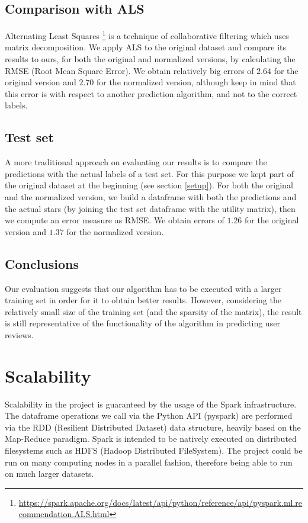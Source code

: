 \documentclass[11pt,a4paper]{article}
\begin{document}
\begin{multicols}{2}
\subsection{Comparison with ALS}
Alternating Least Squares \footnote{\url{https://spark.apache.org/docs/latest/api/python/reference/api/pyspark.ml.recommendation.ALS.html}} is a technique of collaborative filtering which uses matrix decomposition.
We apply ALS to the original dataset and compare its results to ours, for both the original and normalized versions, by calculating the RMSE (Root Mean Square Error).
We obtain relatively big errors of $2.64$ for the original version and $2.70$ for the normalized version, although keep in mind that this error is with respect to another prediction algorithm, and not to the correct labels.


\subsection{Test set}
A more traditional approach on evaluating our results is to compare the predictions with the actual labels of a test set.
For this purpose we kept part of the original dataset at the beginning (see section \ref{setup}).
For both the original and the normalized version, we build a dataframe with both the predictions and the actual stars (by joining the test set dataframe with the utility matrix), then we compute an error measure as RMSE.
We obtain errors of $1.26$ for the original version and $1.37$ for the normalized version.



\subsection{Conclusions}
Our evaluation suggests that our algorithm has to be executed with a larger training set in order for it to obtain better results.
However, considering the relatively small size of the training set (and the sparsity of the matrix), the result is still representative of the functionality of the algorithm in predicting user reviews.



\section{Scalability}\label{scalability}
Scalability in the project is guaranteed by the usage of the Spark infrastructure.
The dataframe operations we call via the Python API (pyspark) are performed via the RDD (Resilient Distributed Dataset) data structure, heavily based on the Map-Reduce paradigm.
Spark is intended to be natively executed on distributed filesystems such as HDFS (Hadoop Distributed FileSystem).
The project could be run on many computing nodes in a parallel fashion, therefore being able to run on much larger datasets.




\end{multicols}
\end{document}
